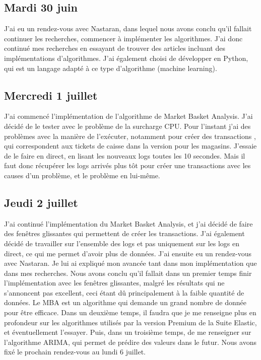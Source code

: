 \documentclass[paper=a4, fontsize=11pt]{scrartcl}
\begin{document}
\subsection{Mardi 30 juin}
    J'ai eu un rendez-vous avec Nastaran, dans lequel nous avons conclu qu'il fallait continuer les recherches, commencer à implémenter les algorithmes. J'ai donc continué mes recherches en essayant de trouver des articles incluant des implémentations d'algorithmes. J'ai également choisi de développer en Python, qui est un langage adapté à ce type d'algorithme (machine learning).
\subsection{Mercredi 1 juillet}
    J'ai commencé l'implémentation de l'algorithme de Market Basket Analysis. J'ai décidé de le tester avec le problème de la surcharge CPU. Pour l'instant j'ai des problèmes avec la manière de l'exécuter, notamment pour créer des \og transactions \fg, qui correspondent aux tickets de caisse dans la version pour les magasins. J'essaie de le faire en direct, en lisant les nouveaux logs toutes les 10 secondes.
    Mais il faut donc récupérer les logs arrivés plus tôt pour créer une transactions avec les causes d'un problème, et le problème en lui-même.
\subsection{Jeudi 2 juillet}
    J'ai continué l'implémentation du Market Basket Analysis, et j'ai décidé de faire des \og fenêtres glissantes \fg qui permettent de créer les transactions. J'ai également décidé de travailler sur l'ensemble des logs et pas uniquement sur les logs en direct, ce qui me permet d'avoir plus de données. J'ai ensuite eu un rendez-vous avec Nastaran. Je lui ai expliqué mon avancée tant dans mon implémentation que dans mes recherches. Nous avons conclu qu'il fallait dans un premier temps finir l'implémentation avec les fenêtres glissantes, malgré les résultats qui ne s'annoncent pas excellent, ceci étant dû principalement à la faible quantité de données. Le MBA est un algorithme qui demande un grand nombre de donnée pour être efficace. Dans un deuxième temps, il faudra que je me renseigne plus en profondeur sur les algorithmes utilisés par la version Premium de la Suite Elastic, et éventuellement l'essayer. Puis, dans un troisième temps, de me renseigner sur l'algorithme ARIMA, qui permet de prédire des valeurs dans le futur. Nous avons fixé le prochain rendez-vous au lundi 6 juillet.
\end{document}

